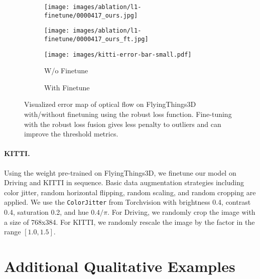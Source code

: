 \documentclass[10pt,twocolumn,letterpaper]{article}
\begin{document}
\begin{figure}[t]
    \begin{subfigure}[b]{0.499\linewidth}
        \texttt{[image: images/ablation/l1-finetune/0000417\_ours.jpg]}
    \end{subfigure}\hfill
    \begin{subfigure}[b]{0.499\linewidth}
        \texttt{[image: images/ablation/l1-finetune/0000417\_ours\_ft.jpg]}
    \end{subfigure}

    \vspace{-4.5pt}
    \begin{subfigure}[b]{\linewidth}
        \texttt{[image: images/kitti-error-bar-small.pdf]}
    \end{subfigure}\vspace{3pt}

    \begin{subfigure}[b]{0.499\linewidth}
        \caption{W/o Finetune}
    \end{subfigure}\hfill
    \begin{subfigure}[b]{0.499\linewidth}
        \caption{With Finetune}
    \end{subfigure}

    \vspace{-5pt}
    \caption{Visualized error map of optical flow on FlyingThings3D with/without finetuning using the robust loss function. Fine-tuning with the robust loss fusion gives less penalty to outliers and can improve the threshold metrics.}
    \vspace{-5pt}

    \label{fig:things-finetune}
\end{figure}

\paragraph{KITTI.} Using the weight pre-trained on FlyingThings3D, we finetune our model on Driving and KITTI in sequence. Basic data augmentation strategies including color jitter, random horizontal flipping, random scaling, and random cropping are applied. We use the \texttt{ColorJitter} from Torchvision \cite{paszke2019pytorch} with brightness 0.4, contrast 0.4, saturation 0.2, and hue $0.4/\pi$. For Driving, we randomly crop the image with a size of 768x384. For KITTI, we randomly rescale the image by the factor in the range $[1.0, 1.5]$.

\section{Additional Qualitative Examples}
\end{document}
